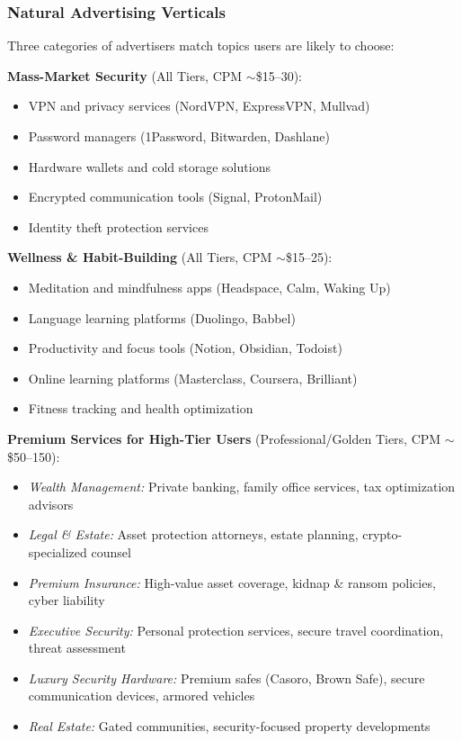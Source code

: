 \subsubsection{Natural Advertising Verticals}

Three categories of advertisers match topics users are likely to choose:

\textbf{Mass-Market Security} (All Tiers, CPM $\sim$\$15--30):
\begin{itemize}
  \item VPN and privacy services (NordVPN, ExpressVPN, Mullvad)
  \item Password managers (1Password, Bitwarden, Dashlane)
  \item Hardware wallets and cold storage solutions
  \item Encrypted communication tools (Signal, ProtonMail)
  \item Identity theft protection services
\end{itemize}

\textbf{Wellness \& Habit-Building} (All Tiers, CPM $\sim$\$15--25):
\begin{itemize}
  \item Meditation and mindfulness apps (Headspace, Calm, Waking Up)
  \item Language learning platforms (Duolingo, Babbel)
  \item Productivity and focus tools (Notion, Obsidian, Todoist)
  \item Online learning platforms (Masterclass, Coursera, Brilliant)
  \item Fitness tracking and health optimization
\end{itemize}

\textbf{Premium Services for High-Tier Users} (Professional/Golden Tiers, CPM $\sim$\$50--150):
\begin{itemize}
  \item \textit{Wealth Management:} Private banking, family office services, tax optimization advisors
  \item \textit{Legal \& Estate:} Asset protection attorneys, estate planning, crypto-specialized counsel
  \item \textit{Premium Insurance:} High-value asset coverage, kidnap \& ransom policies, cyber liability
  \item \textit{Executive Security:} Personal protection services, secure travel coordination, threat assessment
  \item \textit{Luxury Security Hardware:} Premium safes (Casoro, Brown Safe), secure communication devices, armored vehicles
  \item \textit{Real Estate:} Gated communities, security-focused property developments
\end{itemize}

